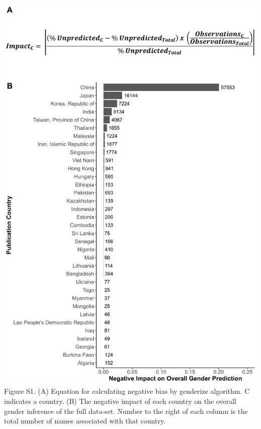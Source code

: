 \documentclass[11pt,]{article}
\begin{document}
\includegraphics{Figure_S1.png} Figure S1. (A) Equation for calculating
negative bias by genderize algorithm. C indicates a country. (B) The
negative impact of each country on the overall gender inference of the
full data-set. Number to the right of each column is the total number of
names associated with that country.

\newpage
\end{document}
